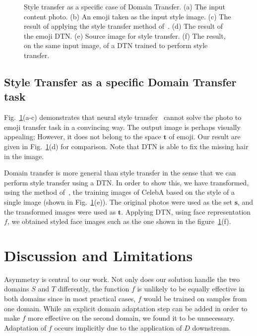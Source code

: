 \documentclass{article} \usepackage{iclr2017_conference,times}
\begin{document}
\begin{figure}[t]
\centering
{}

\caption{\label{fig:styletransfer}Style transfer as a specific case of Domain Transfer. (a) The input content photo. (b) An emoji taken as the input style image. (c) The result of applying the style transfer method of~\cite{styletransfer}.  (d) The result of the emoji DTN.  (e)  Source image for style transfer. (f) The result, on the same input image, of a DTN trained to perform style transfer.}
\end{figure}

\subsection{Style Transfer as a specific Domain Transfer task}

Fig.~\ref{fig:styletransfer}(a-c) demonstrates that neural style transfer~\cite{styletransfer} cannot solve the photo to emoji transfer task in a convincing way. The output image is perhaps visually appealing; However, it does not belong to the space $\mathbf t$ of emoji. Our result are given in Fig.~\ref{fig:styletransfer}(d) for comparison. Note that DTN is able to fix the missing hair in the image.

Domain transfer is more general than style transfer in the sense that we can perform style transfer using a DTN. In order to show this, we have transformed, using the method of~\cite{Johnson2016Perceptual}, the training images of CelebA based on the style of a single image (shown in Fig.~\ref{fig:styletransfer}(e)). The original photos were used as the set $\mathbf s$, and the transformed images were used as $\mathbf t$. Applying DTN, using face representation $f$, we obtained styled face images such as the one shown in the figure~\ref{fig:styletransfer}(f).

\section{Discussion and Limitations}
\label{sec:conclusions}
Asymmetry is central to our work. Not only does our solution handle the two domains $S$ and $T$ differently, the function $f$ is unlikely to be equally effective in both domains since in most practical cases, $f$ would be trained on samples from one domain. While an explicit domain adaptation step can be added in order to make $f$ more effective on the second domain, we found it to be unnecessary. Adaptation of $f$ occurs implicitly due to the application of $D$ downstream. 
\end{document}
